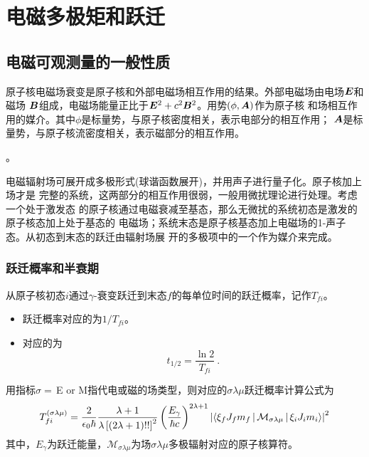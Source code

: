 \chapter{电磁多极矩和跃迁}

\section{电磁可观测量的一般性质}
原子核电磁场衰变是原子核和外部电磁场相互作用的结果。外部电磁场由电场$\bm{E}$和磁场
$\bm{B}$组成，电磁场能量正比于$\bm{E}^2 + c^2 \bm{B}^2$。用势$(\phi, \bm{A})$作为原子核
和场相互作用的媒介。其中$\phi$是标量势，与原子核密度相关，表示电部分的相互作用；
$\bm{A}$是标量势，与原子核流密度相关，表示磁部分的相互作用。

。

电磁辐射场可展开成多极形式(球谐函数展开)，并用声子进行量子化。原子核加上场才是
完整的系统，这两部分的相互作用很弱，一般用微扰理论进行处理。考虑一个处于激发态
的原子核通过电磁衰减至基态，那么无微扰的系统初态是激发的原子核态加上处于基态的
电磁场；系统末态是原子核基态加上电磁场的1-声子态。从初态到末态的跃迁由辐射场展
开的多极项中的一个作为媒介来完成。

\subsection{跃迁概率和半衰期}
\begin{definition}[跃迁概率]
    从原子核初态$i$通过$\gamma$-衰变跃迁到末态$f$的每单位时间的跃迁概率，记作$T_{fi}$。
\end{definition}
\begin{itemize}
    \item 跃迁概率对应的为$1/T_{fi}$。
    \item 对应的为
    \begin{equation}
        \boxed{
        t_{1/2} = \frac{\ln{2}}{T_{fi}}\ .
        }
    \end{equation}
\end{itemize}

用指标$\sigma=\,$E or M指代电或磁的场类型，则对应的$\sigma\lambda\mu$跃迁概率计算公式为
\begin{equation}
    T_{fi}^{(\sigma\lambda\mu)} = \frac{2}{\epsilon_0\hbar}\frac{\lambda+1}{\lambda\left[(2\lambda+1)!!\right]^2}\left(\frac{E_{\gamma}}{\hbar c}\right)^{2\lambda+1} \left|\Braket{\xi_{f}J_{f}m_{f} | \mathcal{M}_{\sigma\lambda\mu} | \xi_{i} J_{i} m_{i}}\right|^2
\end{equation}
其中，$E_{\gamma}$为跃迁能量，$\mathcal{M}_{\sigma\lambda\mu}$为场$\sigma\lambda\mu$多极辐射对应的原子核算符。

